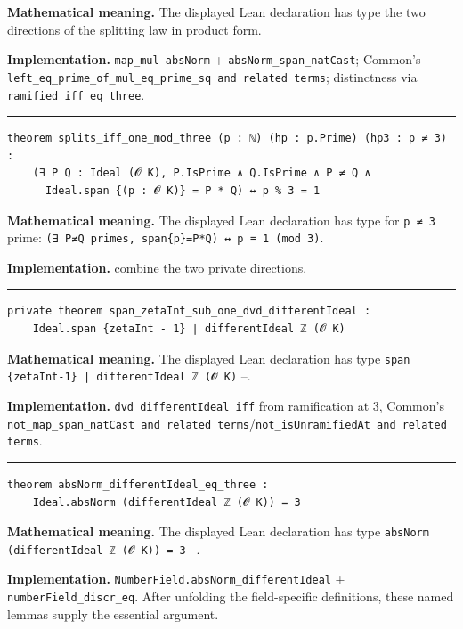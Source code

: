\documentclass[UTF8,a4paper,11pt,fontset=fandol]{ctexart}
\theoremstyle{definition}
\newcommand{\statementsep}{\par\medskip\hrule\medskip}
\begin{document}
\noindent\textbf{Mathematical meaning.} The displayed Lean declaration has type the two directions of the splitting law in product form.\par
\noindent\textbf{Implementation.} \texttt{map\_\allowbreak{}mul absNorm} + \texttt{absNorm\_\allowbreak{}span\_\allowbreak{}natCast}; Common's \texttt{left\_\allowbreak{}eq\_\allowbreak{}prime\_\allowbreak{}of\_\allowbreak{}mul\_\allowbreak{}eq\_\allowbreak{}prime\_\allowbreak{}sq and related terms}; distinctness via \texttt{ramified\_\allowbreak{}iff\_\allowbreak{}eq\_\allowbreak{}three}.\par
\statementsep
\begin{verbatim}
theorem splits_iff_one_mod_three (p : ℕ) (hp : p.Prime) (hp3 : p ≠ 3) :
    (∃ P Q : Ideal (𝓞 K), P.IsPrime ∧ Q.IsPrime ∧ P ≠ Q ∧
      Ideal.span {(p : 𝓞 K)} = P * Q) ↔ p % 3 = 1
\end{verbatim}
\noindent\textbf{Mathematical meaning.} The displayed Lean declaration has type for \texttt{p ≠ 3} prime: \texttt{(∃ P≠Q primes, span\{p\}=P*Q) ↔ p ≡ 1 (mod 3)}.\par
\noindent\textbf{Implementation.} combine the two private directions.\par
\statementsep
\begin{verbatim}
private theorem span_zetaInt_sub_one_dvd_differentIdeal :
    Ideal.span {zetaInt - 1} ∣ differentIdeal ℤ (𝓞 K)
\end{verbatim}
\noindent\textbf{Mathematical meaning.} The displayed Lean declaration has type \texttt{span \{zetaInt-1\} ∣ differentIdeal ℤ (𝓞 K)} --.\par
\noindent\textbf{Implementation.} \texttt{dvd\_\allowbreak{}differentIdeal\_\allowbreak{}iff} from ramification at 3, Common's \texttt{not\_\allowbreak{}map\_\allowbreak{}span\_\allowbreak{}natCast and related terms}/\texttt{not\_\allowbreak{}isUnramifiedAt and related terms}.\par
\statementsep
\begin{verbatim}
theorem absNorm_differentIdeal_eq_three :
    Ideal.absNorm (differentIdeal ℤ (𝓞 K)) = 3
\end{verbatim}
\noindent\textbf{Mathematical meaning.} The displayed Lean declaration has type \texttt{absNorm (differentIdeal ℤ (𝓞 K)) = 3} --.\par
\noindent\textbf{Implementation.} \texttt{NumberField.\allowbreak{}absNorm\_\allowbreak{}differentIdeal} + \texttt{numberField\_\allowbreak{}discr\_\allowbreak{}eq}. After unfolding the field-specific definitions, these named lemmas supply the essential argument.\par
\end{document}
